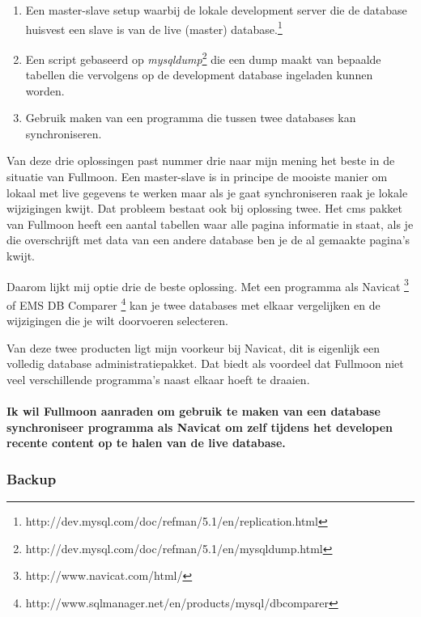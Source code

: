 \documentclass[12pt,a4paper]{article}
\begin{document}
    \begin{enumerate}
      \item Een master-slave setup waarbij de lokale development server die de database huisvest een slave is van de live (master) database.\footnote{ http://dev.mysql.com/doc/refman/5.1/en/replication.html}
      \item Een script gebaseerd op \emph{mysqldump}\footnote{ http://dev.mysql.com/doc/refman/5.1/en/mysqldump.html} die een dump maakt van bepaalde tabellen die vervolgens op de development database ingeladen kunnen worden.
      \item Gebruik maken van een programma die tussen twee databases kan synchroniseren.
    \end{enumerate}
    
    Van deze drie oplossingen past nummer drie naar mijn mening het beste in de situatie van Fullmoon. Een master-slave is in principe de mooiste manier om lokaal met live gegevens te werken maar als je gaat synchroniseren raak je lokale wijzigingen kwijt. Dat probleem bestaat ook bij oplossing twee. Het {\sc cms} pakket van Fullmoon heeft een aantal tabellen waar alle pagina informatie in staat, als je die overschrijft met data van een andere database ben je de al gemaakte pagina's kwijt.
    
    Daarom lijkt mij optie drie de beste oplossing. Met een programma als Navicat \footnote{ http://www.navicat.com/html/} of EMS DB Comparer \footnote{ http://www.sqlmanager.net/en/products/mysql/dbcomparer} kan je twee databases met elkaar vergelijken en de wijzigingen die je wilt doorvoeren selecteren.
    
    Van deze twee producten ligt mijn voorkeur bij Navicat, dit is eigenlijk een volledig database administratiepakket. Dat biedt als voordeel dat Fullmoon niet veel verschillende programma's naast elkaar hoeft te draaien.
    
    \paragraph{Ik wil Fullmoon aanraden om gebruik te maken van een database synchroniseer programma als Navicat om zelf tijdens het developen recente content op te halen van de live database.}
    
    \subsubsection{Backup}
    
\end{document}
